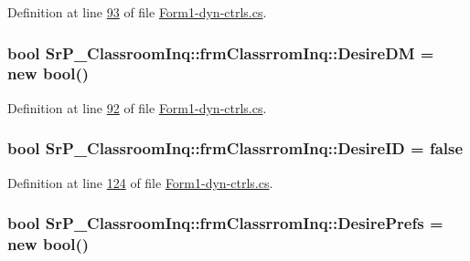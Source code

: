 \-Definition at line \hyperlink{_form1-dyn-ctrls_8cs_source_l00093}{93} of file \hyperlink{_form1-dyn-ctrls_8cs_source}{\-Form1-\/dyn-\/ctrls.\-cs}.

\hypertarget{class_sr_p___classroom_inq_1_1frm_classrrom_inq_a8f8f9bb905b290fa448b445560458f89}{
\subsubsection[{\-Desire\-D\-M}]{\setlength{\rightskip}{0pt plus 5cm}bool {\bf \-Sr\-P\-\_\-\-Classroom\-Inq\-::frm\-Classrrom\-Inq\-::\-Desire\-D\-M} = new bool()}}
\label{class_sr_p___classroom_inq_1_1frm_classrrom_inq_a8f8f9bb905b290fa448b445560458f89}


\-Definition at line \hyperlink{_form1-dyn-ctrls_8cs_source_l00092}{92} of file \hyperlink{_form1-dyn-ctrls_8cs_source}{\-Form1-\/dyn-\/ctrls.\-cs}.

\hypertarget{class_sr_p___classroom_inq_1_1frm_classrrom_inq_aad36cc9a93fb79969dd3b0d0fe52b793}{
\subsubsection[{\-Desire\-I\-D}]{\setlength{\rightskip}{0pt plus 5cm}bool {\bf \-Sr\-P\-\_\-\-Classroom\-Inq\-::frm\-Classrrom\-Inq\-::\-Desire\-I\-D} = false}}
\label{class_sr_p___classroom_inq_1_1frm_classrrom_inq_aad36cc9a93fb79969dd3b0d0fe52b793}


\-Definition at line \hyperlink{_form1-dyn-ctrls_8cs_source_l00124}{124} of file \hyperlink{_form1-dyn-ctrls_8cs_source}{\-Form1-\/dyn-\/ctrls.\-cs}.

\hypertarget{class_sr_p___classroom_inq_1_1frm_classrrom_inq_a263bbbace2f9c25e5f92573e5f4845ba}{
\subsubsection[{\-Desire\-Prefs}]{\setlength{\rightskip}{0pt plus 5cm}bool {\bf \-Sr\-P\-\_\-\-Classroom\-Inq\-::frm\-Classrrom\-Inq\-::\-Desire\-Prefs} = new bool()}}
\label{class_sr_p___classroom_inq_1_1frm_classrrom_inq_a263bbbace2f9c25e5f92573e5f4845ba}


